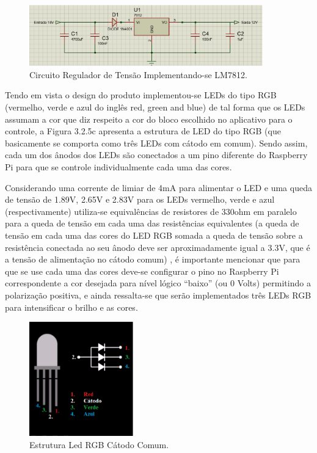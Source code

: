 \begin{figure}[H]
    \centering
    \includegraphics[width=0.9\textwidth]{figuras/regulador.eps}
    \caption{Circuito Regulador de Tensão Implementando-se LM7812.}
    \label{fig:regulador}
\end{figure}

Tendo em vista o design do produto implementou-se LEDs do tipo RGB (vermelho, verde e azul do inglês red, green and blue) de tal forma
que os LEDs assumam a cor que diz respeito a cor do bloco escolhido no aplicativo para o controle, a  Figura 3.2.5c apresenta a estrutura
de LED do tipo RGB (que basicamente se comporta como três LEDs com cátodo em comum). Sendo assim, cada um dos ânodos dos LEDs são
conectados a um pino diferente do Raspberry Pi para que se controle individualmente cada uma das cores.

Considerando uma corrente de limiar de 4mA para alimentar o LED e uma queda de tensão de 1.89V, 2.65V e 2.83V para os LEDs vermelho,
verde e azul (respectivamente) utiliza-se equivalências de resistores de 330ohm em paralelo para a queda de tensão em cada uma das resistências
equivalentes (a queda de tensão em cada uma das cores do LED RGB somada a queda de tensão sobre a resistência conectada ao seu ânodo deve
ser aproximadamente igual a 3.3V, que é a tensão de alimentação no cátodo comum) , é importante mencionar que para
que se use cada uma das cores deve-se configurar o pino no Raspberry Pi correspondente a cor desejada para nível lógico “baixo” (ou 0
Volts) permitindo a polarização positiva, e ainda ressalta-se que serão implementados três LEDs RGB para intensificar o brilho e as cores.

\begin{figure}[H]
    \centering
    \includegraphics[width=0.4\textwidth]{figuras/led.eps}
    \caption{Estrutura Led RGB Cátodo Comum.}
    \label{fig:led}
\end{figure}

